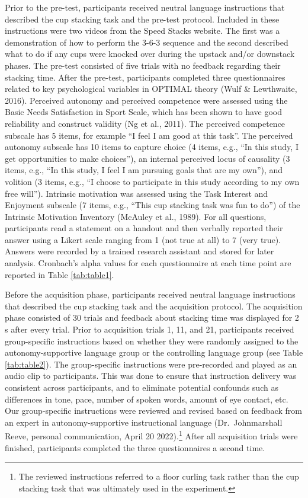 \documentclass[
  doc, donotrepeattitle,floatsintext]{apa7}
\begin{document}
Prior to the pre-test, participants received neutral language instructions that described the cup stacking task and the pre-test protocol. Included in these instructions were two videos from the Speed Stacks website. The first was a demonstration of how to perform the 3-6-3 sequence and the second described what to do if any cups were knocked over during the upstack and/or downstack phases. The pre-test consisted of five trials with no feedback regarding their stacking time. After the pre-test, participants completed three questionnaires related to key psychological variables in OPTIMAL theory (Wulf \& Lewthwaite, 2016). Perceived autonomy and perceived competence were assessed using the Basic Needs Satisfaction in Sport Scale, which has been shown to have good reliability and construct validity (Ng et al., 2011). The perceived competence subscale has 5 items, for example ``I feel I am good at this task''. The perceived autonomy subscale has 10 items to capture choice (4 items, e.g., ``In this study, I get opportunities to make choices''), an internal perceived locus of causality (3 items, e.g., ``In this study, I feel I am pursuing goals that are my own''), and volition (3 items, e.g., ``I choose to participate in this study according to my own free will''). Intrinsic motivation was assessed using the Task Interest and Enjoyment subscale (7 items, e.g., ``This cup stacking task was fun to do'') of the Intrinsic Motivation Inventory (McAuley et al., 1989). For all questions, participants read a statement on a handout and then verbally reported their answer using a Likert scale ranging from 1 (not true at all) to 7 (very true). Answers were recorded by a trained research assistant and stored for later analysis. Cronbach's alpha values for each questionnaire at each time point are reported in Table \ref{tab:table1}.

Before the acquisition phase, participants received neutral language instructions that described the cup stacking task and the acquisition protocol. The acquisition phase consisted of 30 trials and feedback about stacking time was displayed for 2 s after every trial. Prior to acquisition trials 1, 11, and 21, participants received group-specific instructions based on whether they were randomly assigned to the autonomy-supportive language group or the controlling language group (see Table \ref{tab:table2}). The group-specific instructions were pre-recorded and played as an audio clip to participants. This was done to ensure that instruction delivery was consistent across participants, and to eliminate potential confounds such as differences in tone, pace, number of spoken words, amount of eye contact, etc. Our group-specific instructions were reviewed and revised based on feedback from an expert in autonomy-supportive instructional language (Dr.~Johnmarshall Reeve, personal communication, April 20 2022).\footnote{The reviewed instructions referred to a floor curling task rather than the cup stacking task that was ultimately used in the experiment.} After all acquisition trials were finished, participants completed the three questionnaires a second time.
\end{document}
